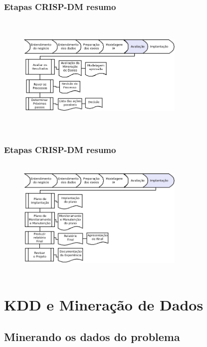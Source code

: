 \documentclass[11pt]{beamer}
\begin{document}
\begin{frame}\frametitle{ Etapas CRISP-DM resumo}
	\transdissolve[duration=1, direction=25]
	\begin{figure}[!ht]
		\includegraphics[width=80mm, height=58mm]{Figuras/Crisp/Avaliacao.png}
	\end{figure}
\end{frame}

\begin{frame}\frametitle{ Etapas CRISP-DM resumo}
	\transdissolve[duration=1, direction=25]
	\begin{figure}[!ht]
		\includegraphics[width=80mm, height=58mm]{Figuras/Crisp/Implantacao.png}
	\end{figure}
\end{frame}

\section{KDD e Mineração de Dados}
\subsection*{ Minerando os dados do problema}
\end{document}
